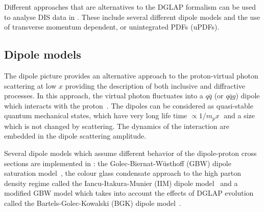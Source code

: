 

Different approaches that are alternatives to the DGLAP formalism can be used to analyse DIS data in \fitter.
These include several different dipole models and the use of 
transverse momentum dependent, or unintegrated PDFs (uPDFs).

\subsection{Dipole models}

The dipole picture provides an alternative approach to the proton-virtual photon
 scattering at low $x$ providing the description of both inclusive and 
diffractive processes.
 In this approach, the virtual photon fluctuates into a $q\bar q$ (or $q\bar q g$) 
 dipole which interacts with the proton~\cite{NNZ:91}.  
The dipoles can be considered as quasi-stable quantum mechanical states, which have very long 
life time $\propto 1/m_p x\;$ and a size which is not changed by scattering.
The dynamics of the interaction are embedded in the dipole scattering amplitude.


Several dipole models which assume different behavior of the dipole-proton 
cross sections are implemented in \fitter:
the Golec-Biernat-W\"usthoff (GBW)
dipole saturation model~\cite{Golec-Biernat:1998js},
the colour glass condensate approach to the high parton density 
regime called the Iancu-Itakura-Munier (IIM) dipole model~\cite{Iancu:2003ge} and 
a modified GBW model which takes into account the effects of  
DGLAP evolution called the Bartels-Golec-Kowalski (BGK) dipole model~\cite{Bartels:2002cj}.

